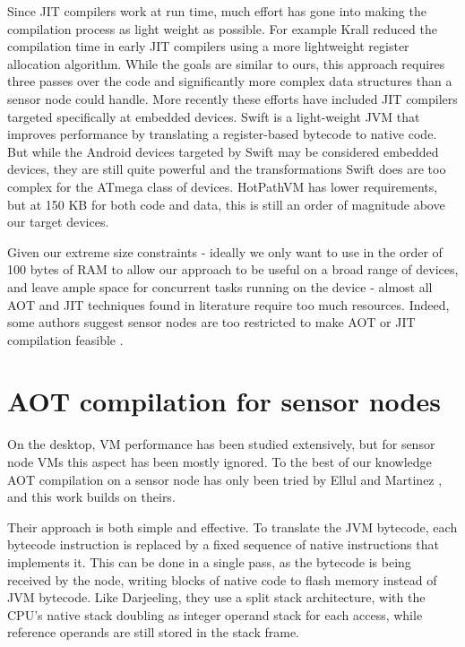 Since JIT compilers work at run time, much effort has gone into making the compilation process as light weight as possible. For example Krall \cite{Krall:1998} reduced the compilation time in early JIT compilers using a more lightweight register allocation algorithm. While the goals are similar to ours, this approach requires three passes over the code and significantly more complex data structures than a sensor node could handle. More recently these efforts have included JIT compilers targeted specifically at embedded devices. Swift \cite{Zhang:2012wf} is a light-weight JVM that improves performance by translating a register-based bytecode to native code. But while the Android devices targeted by Swift may be considered embedded devices, they are still quite powerful and the transformations Swift does are too complex for the ATmega class of devices. HotPathVM \cite{Gal:2006} has lower requirements, but at 150 KB for both code and data, this is still an order of magnitude above our target devices.

Given our extreme size constraints - ideally we only want to use in the order of 100 bytes of RAM to allow our approach to be useful on a broad range of devices, and leave ample space for concurrent tasks running on the device - almost all AOT and JIT techniques found in literature require too much resources. Indeed, some authors suggest sensor nodes are too restricted to make AOT or JIT compilation feasible \cite{Aslam:2011thesis, Wirjawan:2008}.

\section{AOT compilation for sensor nodes}
\label{sec-state-of-the-art-elluls-aot}
On the desktop, VM performance has been studied extensively, but for sensor node VMs this aspect has been mostly ignored. To the best of our knowledge AOT compilation on a sensor node has only been tried by Ellul and Martinez \cite{Ellul:2010iw, Ellul:2012thesis}, and this work builds on theirs.

Their approach is both simple and effective. To translate the JVM bytecode, each bytecode instruction is replaced by a fixed sequence of native instructions that implements it. This can be done in a single pass, as the bytecode is being received by the node, writing blocks of native code to flash memory instead of JVM bytecode. Like Darjeeling, they use a split stack architecture, with the CPU's native stack doubling as integer operand stack for each access, while reference operands are still stored in the stack frame.

